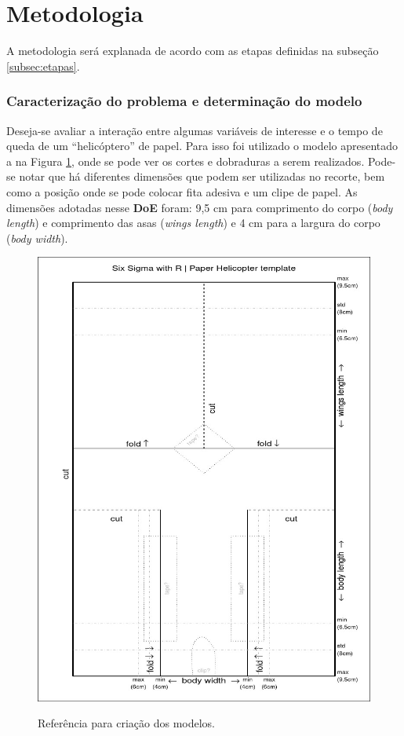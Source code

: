 \section{Metodologia}

A metodologia será explanada de acordo com as etapas definidas na subseção \ref{subsec:etapas}.

\subsubsection*{Caracterização do problema e determinação do modelo}

Deseja-se avaliar a interação entre algumas variáveis de interesse e o tempo de queda de um ``helicóptero'' de papel. Para isso foi utilizado o modelo apresentado a na Figura \ref{fig:helicopter}, onde se pode ver os cortes e dobraduras a serem realizados. Pode-se notar que há diferentes dimensões que podem ser utilizadas no recorte, bem como a posição onde se pode colocar fita adesiva e um clipe de papel. As dimensões adotadas nesse \textbf{DoE} foram: 9,5 cm para comprimento do corpo (\emph{body length}) e comprimento das asas (\emph{wings length}) e 4 cm para a largura do corpo (\emph{body width}).

\begin{figure}[h]
  \centering
  \caption{Referência para criação dos modelos.}
  \includegraphics[scale=0.3]{images/helicopter.jpg}
  \label{fig:helicopter}
\end{figure}

